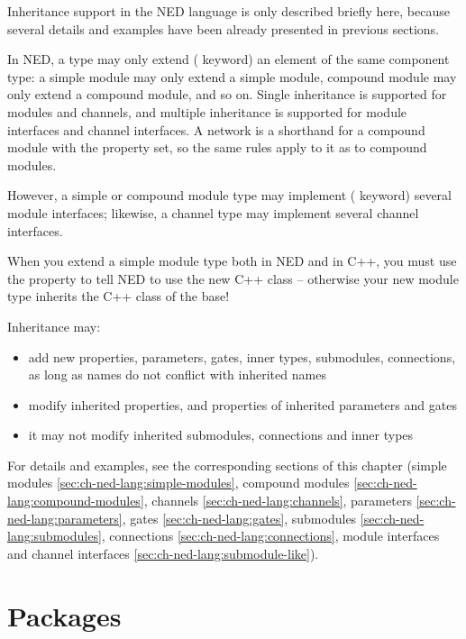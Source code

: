 Inheritance support in the NED language is only described briefly here,
because several details and examples have been already presented in
previous sections.

In NED, a type may only extend ( keyword) an element of
the same component type: a simple module may only extend a simple module,
compound module may only extend a compound module, and so on. Single
inheritance is supported for modules and channels, and multiple inheritance
is supported for module interfaces and channel interfaces. A network is a
shorthand for a compound module with the  property set, so
the same rules apply to it as to compound modules.

However, a simple or compound module type may implement (
keyword) several module interfaces; likewise, a channel type may implement
several channel interfaces.

\begin{important}
    When you extend a simple module type both in NED and in C++, you must
    use the  property to tell NED to use the new C++ class --
    otherwise your new module type inherits the C++ class of the base!
\end{important}

Inheritance may:
\begin{itemize}
    \item add new properties, parameters, gates, inner types, submodules,
          connections, as long as names do not conflict with inherited names
    \item modify inherited properties, and properties of inherited parameters and
          gates
    \item it may not modify inherited submodules, connections and inner types
\end{itemize}

For details and examples, see the corresponding sections of this chapter
(simple modules \ref{sec:ch-ned-lang:simple-modules},
compound modules \ref{sec:ch-ned-lang:compound-modules},
channels \ref{sec:ch-ned-lang:channels},
parameters \ref{sec:ch-ned-lang:parameters},
gates \ref{sec:ch-ned-lang:gates},
submodules \ref{sec:ch-ned-lang:submodules},
connections \ref{sec:ch-ned-lang:connections},
module interfaces and channel interfaces \ref{sec:ch-ned-lang:submodule-like}).



\section{Packages}
\label{sec:ch-ned-lang:packages}

